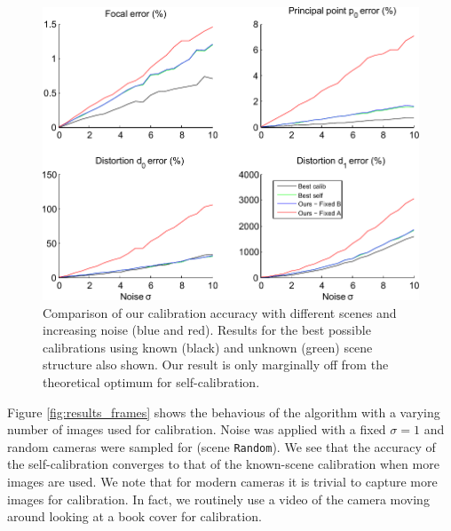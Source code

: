 \documentclass[10pt,twocolumn,letterpaper]{article}
\begin{document}
\begin{figure}
\centering
\includegraphics[width=\linewidth]{images/resultsPointNoise.pdf}
\caption{Comparison of our calibration accuracy with different scenes and increasing noise (blue and red). Results for the best possible calibrations using known (black) and unknown (green) scene structure also shown. Our result is only marginally off from the theoretical optimum for self-calibration.}
\label{fig:results_noise}
\end{figure}

Figure \ref{fig:results_frames} shows the behavious of the algorithm with a varying number of images used for calibration. Noise was applied with a fixed $\sigma=1$ and random cameras were sampled for (scene \texttt{Random}). We see that the accuracy of the self-calibration converges to that of the known-scene calibration when more images are used. We note that for modern cameras it is trivial to capture more images for calibration. In fact, we routinely use a video of the camera moving around looking at a book cover for calibration.
\end{document}
